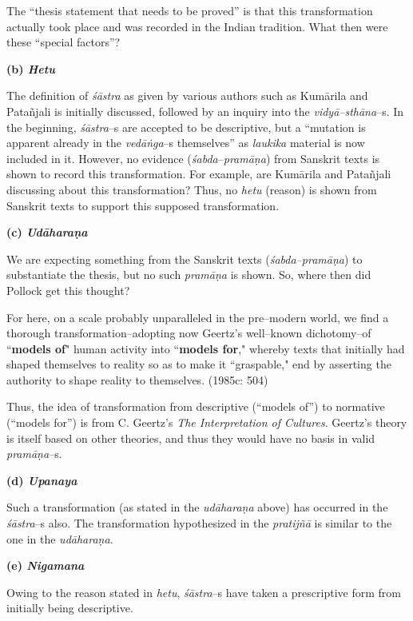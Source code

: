 The “thesis statement that needs to be proved” is that this transformation actually took place and was recorded in the Indian tradition. What then were these “special factors”?

\textbf{(b) \textit{Hetu}}

The definition of \textit{śāstra }as given by various authors such as Kumārila and Patañjali is initially discussed, followed by an inquiry into the \textit{vidyā–sthāna}–s. In the beginning, \textit{śāstra}–s are accepted to be descriptive, but a “mutation is apparent already in the \textit{vedāṅga}–s themselves” as \textit{laukika} material is now included in it. However, no evidence (\textit{śabda}–\textit{pramāṇa}) from Sanskrit texts is shown to record this transformation. For example, are Kumārila and Patañjali discussing about this transformation? Thus, no \textit{hetu} (reason) is shown from Sanskrit texts to support this supposed transformation.

\textbf{(c) \textit{Udāharaṇa}}

We are expecting something from the Sanskrit texts (\textit{śabda–pramāṇa}) to substantiate the thesis, but no such \textit{pramāṇa} is shown. So, where then did Pollock get this thought?

\begin{myquote}
For here, on a scale probably unparalleled in the pre–modern world, we find a thorough transformation–adopting now Geertz's well–known dichotomy–of ``\textbf{models of}" human activity into ``\textbf{models for}," whereby texts that initially had shaped themselves to reality so as to make it ``graspable," end by asserting the authority to shape reality to themselves. (1985c: 504)
\end{myquote}

Thus, the idea of transformation from descriptive (“models of”) to normative (“models for”) is from C. Geertz’s \textit{The Interpretation of Cultures}. Geertz’s theory is itself based on other theories, and thus they would have no basis in valid\textit{ pramāṇa}–s.

\textbf{(d) \textit{Upanaya}}

Such a transformation (as stated in the \textit{udāharaṇa} above) has occurred in the \textit{śāstra}–s also. The transformation hypothesized in the \textit{pratijñā} is similar to the one in the\textit{ udāharaṇa}.


\textbf{(e) \textit{Nigamana}}

Owing to the reason stated in \textit{hetu}, \textit{śāstra}–s have taken a prescriptive form from initially being descriptive.

